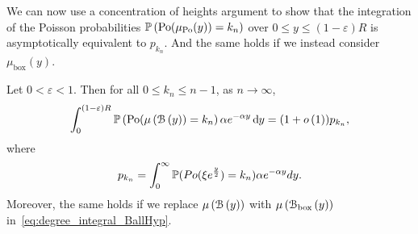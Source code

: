 We can now use a concentration of heights argument to show that the integration of the Poisson probabilities $\mathbb{P}\left({\mathrm{Po}}(\mu_{{\mathrm{Po}}}(y)) = k_n\right)$ over $0 \le y \le (1-\varepsilon) R$ is asymptotically equivalent to $p_{k_n}$. And the same holds if we instead consider $\mu_{\mathrm{box}}(y)$.

\begin{lemma}\label{lem:degree_integral}
Let $0 < \varepsilon < 1$. Then for all $0 \le k_n \le n - 1$, as $n \to \infty$,
\begin{equation}\label{eq:degree_integral_BallHyp}
	\int_0^{(1-\varepsilon)R} \mathbb{P}\left({\mathrm{Po}}(\mu\left({\mathcal B}\left(y\right)\right) = k_n\right) \alpha e^{-\alpha y} \operatorname{\mathrm{d}\hspace{-2pt}} y
	= (1+o\left(1\right)) p_{k_n},
\end{equation}
where
\begin{equation}\label{eq:def_average_degree_Gbox_phi}
	p_{k_n} = \int_0^\infty \mathbb{P}(Po(\xi e^{\frac{y}{2}})=k_n)\alpha e^{-\alpha y}dy.
\end{equation}
Moreover, the same holds if we replace $\mu\left({\mathcal B}\left(y\right)\right)$ with $\mu\left({\mathcal B}_{\text{box}}\left(y\right)\right)$ in~\eqref{eq:degree_integral_BallHyp}.
\end{lemma}

